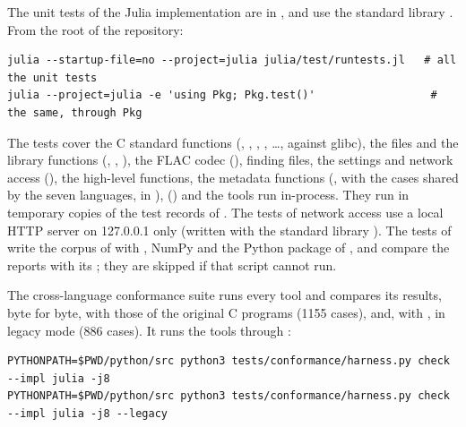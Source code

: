 The unit tests of the Julia implementation are in , and use the standard
library . From the root of the repository:

\begin{lstlisting}[style=shell]
julia --startup-file=no --project=julia julia/test/runtests.jl   # all the unit tests
julia --project=julia -e 'using Pkg; Pkg.test()'                  # the same, through Pkg
\end{lstlisting}

The tests cover the C standard functions (, , ,
, \ldots, against glibc), the files and the library functions
(, , ), the FLAC codec
(), finding files, the settings and network access
(), the high-level functions, the metadata functions
(, with the cases shared by the seven languages, in
),  () and the tools run
in-process. They run in temporary copies of the test records of . The
tests of network access use a local HTTP server on 127.0.0.1 only (written with the
standard library ). The tests of  write the corpus of
 with , NumPy and the Python package of
, and compare the reports with its ; they are skipped
if that script cannot run.

The cross-language conformance suite runs every tool and compares its results, byte for
byte, with those of the original C programs (1155 cases), and, with , in
legacy mode (886 cases). It runs the tools through :

\begin{lstlisting}[style=shell]
PYTHONPATH=$PWD/python/src python3 tests/conformance/harness.py check --impl julia -j8
PYTHONPATH=$PWD/python/src python3 tests/conformance/harness.py check --impl julia -j8 --legacy
\end{lstlisting}
